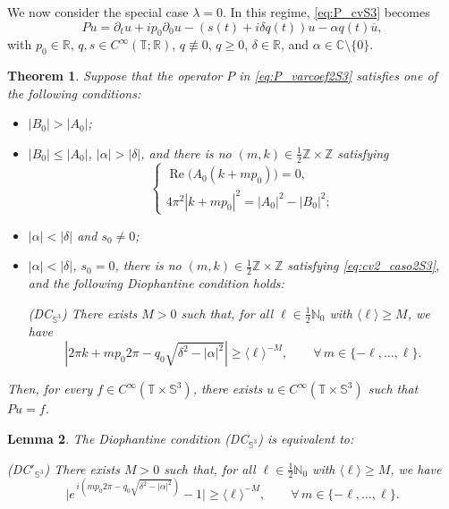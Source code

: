 \documentclass[11pt,reqno]{amsart}
\numberwithin{equation}{section}
\newtheorem{theorem}{Theorem}[section]
\newtheorem{lemma}[theorem]{Lemma}
\begin{document}
	\medskip
	We now consider the special case $\lambda=0$. In this regime, \eqref{eq:P_cvS3} becomes
	\begin{equation}\label{eq:P_varcoef2S3}
		Pu=\partial_t u+ip_0\partial_0 u-(s(t)+i\delta q(t))u-\alpha q(t)\overline u,
	\end{equation}
	with $p_0\in\mathbb{R}$, $q,s\in C^\infty(\mathbb{T};\mathbb{R})$, $q\not\equiv 0$, $q\ge 0$, $\delta\in\mathbb{R}$, and $\alpha\in\mathbb{C}\setminus\{0\}$.
	
	\begin{theorem}\label{thm:S3_lambda0}
		Suppose that the operator $P$ in \eqref{eq:P_varcoef2S3} satisfies one of the following conditions:
		\begin{itemize}
			\item[(1)] $|B_0|>|A_0|$;
			\item[(2)] $|B_0|\le |A_0|$, $|\alpha|>|\delta|$, and there is no $(m,k)\in \tfrac12\mathbb{Z}\times\mathbb{Z}$ satisfying
			\begin{equation}\label{eq:cv2_caso2S3}
				\begin{cases}
					\operatorname{Re}\bigl(A_0(k+m p_0)\bigr)=0,\\[3mm]
					4\pi^2|k+m p_0|^2=|A_0|^2-|B_0|^2;
				\end{cases}
			\end{equation}
			\item[(3)] $|\alpha|<|\delta|$ and $s_0\neq 0$;
			\item[(4)] $|\alpha|<|\delta|$, $s_0=0$, there is no $(m,k)\in\tfrac12\mathbb{Z}\times\mathbb{Z}$ satisfying \eqref{eq:cv2_caso2S3}, and the following Diophantine condition holds:
			
			\medskip\noindent
			\textup{(DC$_{\mathbb{S}^3}$)} There exists $M>0$ such that, for all $\ell\in\tfrac12\mathbb{N}_0$ with $\langle\ell\rangle\ge M$, we have
			\[
			|2\pi k + m p_0 2\pi-q_0\sqrt{\delta^2-|\alpha|^2}|\ge \langle\ell\rangle^{-M},
			\qquad \forall\, m\in\{-\ell,\dots,\ell\}.
			\]
		\end{itemize}
		
		Then, for every $f\in C^\infty(\mathbb{T}\times \mathbb{S}^3)$, there exists $u\in C^\infty(\mathbb{T}\times \mathbb{S}^3)$ such that $Pu=f$.
	\end{theorem}
	
	\begin{lemma}\label{lem:dcS3_equiv}
		The Diophantine condition \textup{(DC$_{\mathbb{S}^3}$)} is equivalent to:
		\medskip\noindent
		
		\textup{(DC$'_{\mathbb{S}^3}$)} There exists $M>0$ such that, for all $\ell\in\tfrac12\mathbb{N}_0$ with $\langle\ell\rangle\ge M$, we have
		\[
		\bigl|e^{\,i(mp_0 2\pi-q_0\sqrt{\delta^2-|\alpha|^2})}-1\bigr|\ge \langle\ell\rangle^{-M},
		\qquad \forall\, m\in\{-\ell,\dots,\ell\}.
		\]
	\end{lemma}
	
\end{document}
